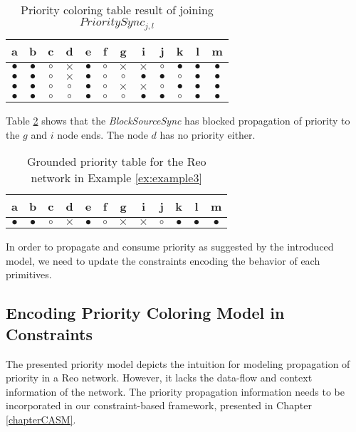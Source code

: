\begin{BehExample}
\begin{table}
	\noindent
	\begin{tabular}{|c|c|c|c|c|c|c|c|c|c|c|c|}
		\hline
		a&b&c&d&e&f&g&i&j&k&l&m\\
		\hline
		$\bullet$ & $\bullet$ & $\circ$ & $\times$ & $\bullet$ & $\circ$ & $\times$ & $\times$ & $\circ$ & $\bullet$ & $\bullet$ & $\bullet$ \\ 
		\hline
		$\bullet$ & $\bullet$ & $\circ$ & $\times$ & $\bullet$ & $\circ$ & $\circ$ & $\bullet$ & $\bullet$ & $\circ$ & $\bullet$ & $\bullet$ \\ 
		\hline
		$\bullet$ & $\bullet$ & $\circ$ & $\circ$ & $\bullet$ & $\circ$ & $\times$ & $\times$ & $\circ$ & $\bullet$ & $\bullet$ & $\bullet$ \\ 
		\hline
		$\bullet$ & $\bullet$ & $\circ$ & $\circ$ & $\bullet$ & $\circ$ & $\circ$ & $\bullet$ & $\bullet$ & $\circ$ & $\bullet$ & $\bullet$ \\ 
		\hline
	\end{tabular}
\caption{Priority coloring table result of joining $PrioritySync_{j, l}$}
\label{tab:x4}
\end{table}

Table \ref{tab:x5} shows that the \emph{BlockSourceSync} has blocked propagation of priority to the $g$ and $i$ node ends. The node $d$ has no priority either. 

\begin{table}
	\noindent
	\begin{tabular}{|c|c|c|c|c|c|c|c|c|c|c|c|}
		\hline	
		a&b&c&d&e&f&g&i&j&k&l&m\\
		\hline
		$\bullet$ & $\bullet$ & $\circ$ & $\times$ & $\bullet$ & $\circ$ & $\times$ & $\times$ & $\circ$ & $\bullet$ & $\bullet$ & $\bullet$ \\
		\hline
	\end{tabular}
	\caption{Grounded priority table for the Reo network in Example \ref{ex:example3}}
	\label{tab:x5}
\end{table}
\end{BehExample}

In order to propagate and consume priority as suggested by the introduced model, we need to update the constraints encoding the behavior of each primitives.  

\subsection{Encoding Priority Coloring Model in Constraints}
The presented priority model depicts the intuition for modeling propagation of priority in a Reo network. However, it lacks the data-flow and context information of the network. The priority propagation information needs to be incorporated in our constraint-based framework, presented in Chapter \ref{chapterCASM}.

